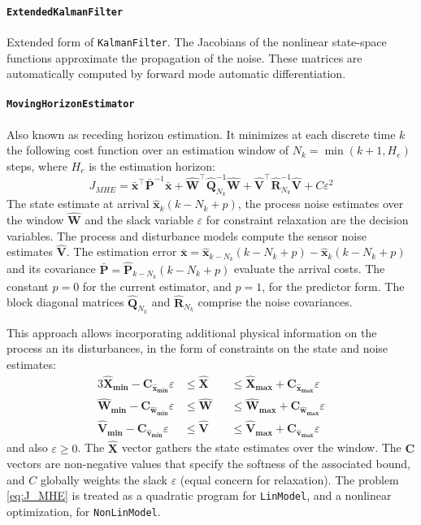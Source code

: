 \paragraph{\texttt{ExtendedKalmanFilter}}
Extended form of \texttt{KalmanFilter}. The Jacobians of the nonlinear state-space functions approximate the propagation of the noise. These matrices are automatically computed by forward mode automatic differentiation.

\paragraph{\texttt{MovingHorizonEstimator}}
Also known as receding horizon estimation. It minimizes at each discrete time $k$ the following cost function over an estimation window of $N_k = \min(k+1, H_e)$ steps, where $H_e$ is the estimation horizon:
\begin{equation}\label{eq:J_MHE}
    J_{\mathit{MHE}} = \bar{\mathbf{x}}^\intercal \bar{\mathbf{P}}^{-1} \bar{\mathbf{x}} 
    + \mathbf{\hat{W}}^\intercal \mathbf{\hat{Q}}_{N_k}^{-1} \mathbf{\hat{W}}  
    + \mathbf{\hat{V}}^\intercal \mathbf{\hat{R}}_{N_k}^{-1} \mathbf{\hat{V}}
    + C \varepsilon^2
\end{equation}
The state estimate at arrival $\mathbf{\hat{x}}_k(k-N_k+p)$, the process noise estimates over the window $\mathbf{\hat{W}}$ and the slack variable $\varepsilon$ for constraint relaxation are the decision variables. The process and disturbance models compute the sensor noise estimates $\mathbf{\hat{V}}$. The estimation error $\bar{\mathbf{x}} = \mathbf{\hat{x}}_{k-N_k}(k-N_k+p) - \mathbf{\hat{x}}_{k}(k-N_k+p)$ and its covariance $\bar{\mathbf{P}} = \mathbf{\hat{P}}_{k-N_k}(k-N_k+p)$ evaluate the arrival costs. The constant $p=0$ for the current estimator, and $p=1$, for the predictor form. The block diagonal matrices $\mathbf{\hat{Q}}_{N_k}$ and $\mathbf{\hat{R}}_{N_k}$ comprise the noise covariances.

This approach allows incorporating additional physical information on the process an its disturbances, in the form of constraints on the state and noise estimates:
\begin{alignat}{3}
    \mathbf{\hat{X}_{min} - C_{\hat{x}_{min}}} \varepsilon &\le \mathbf{\hat{X}} &&\le \mathbf{\hat{X}_{max} + C_{\hat{x}_{max}}} \varepsilon \\
    \mathbf{\hat{W}_{min} - C_{\hat{w}_{min}}} \varepsilon &\le \mathbf{\hat{W}} &&\le \mathbf{\hat{W}_{max} + C_{\hat{w}_{max}}} \varepsilon \\
    \mathbf{\hat{V}_{min} - C_{\hat{v}_{min}}} \varepsilon &\le \mathbf{\hat{V}} &&\le \mathbf{\hat{V}_{max} + C_{\hat{v}_{max}}} \varepsilon
\end{alignat}
and also $\varepsilon \ge 0$. The $\mathbf{\hat{X}}$ vector gathers the state estimates over the window. The $\mathbf{C}$ vectors are non-negative values that specify the softness of the associated bound, and $C$ globally weights the slack $\varepsilon$ (equal concern for relaxation). The problem \eqref{eq:J_MHE} is treated as a quadratic program for \texttt{LinModel}, and a nonlinear optimization, for \texttt{NonLinModel}.


